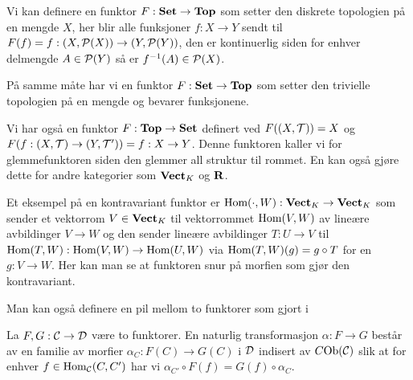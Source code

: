 \begin{eksempel}\label{Ex:DiskFunkt}
    Vi kan definere en funktor $F:\textnormal{\textbf{Set}}\to\textnormal{\textbf{Top}}$ som setter den diskrete topologien på en mengde $X$, her blir alle funksjoner $f: X\to Y$ sendt til $F(f)=f:(X,\mathcal{P}(X))\to (Y,\mathcal{P}(Y))$, den er kontinuerlig siden for enhver delmengde $A\in \mathcal{P}(Y)$ så er $f^{-1}(A)\in\mathcal{P}(X)$.
\end{eksempel}
På samme måte har vi en funktor $F:\textnormal{\textbf{Set}}\to\textnormal{\textbf{Top}}$ som setter den trivielle topologien på en mengde og bevarer funksjonene.

\begin{eksempel}\label{Ex:Glemmefunktor}
    Vi har også en funktor $F:\textnormal{\textbf{Top}}\to\textnormal{\textbf{Set}}$ definert ved $F((X,\mathcal{T})) = X$ og $F(f:(X,\mathcal{T})\to (Y,\mathcal{T}')) = f: X\to Y$. Denne funktoren kaller vi for glemmefunktoren siden den glemmer all struktur til rommet. En kan også gjøre dette for andre kategorier som $\textnormal{\textbf{Vect}}_K$ og $\textnormal{\textbf{{R}}}$.
\end{eksempel}

\begin{eksempel}\label{ex:Homfunkt}
  Et eksempel på en kontravariant funktor er
  $\textnormal{Hom}(\cdot,W):\textnormal{\textbf{Vect}}_K\to\textnormal{\textbf{Vect}}_K$ som sender et vektorrom
  $V\in\textnormal{\textbf{Vect}}_K$ til vektorrommet $\textnormal{Hom}(V,W)$ av lineære
  avbildinger $V\to W$ og den sender lineære avbildinger $T:U\to
  V$ til $\textnormal{Hom}(T,W):\textnormal{Hom}(V,W)\to\textnormal{Hom}(U,W)$ via
  $\textnormal{Hom}(T,W)(g)=g\circ T$ for en $g:V\to W$. Her kan man se at
  funktoren snur på morfien som gjør den kontravariant.
\end{eksempel}

Man kan også definere en pil mellom to funktorer som gjort
i \citep{Agore2023}
\begin{definisjon}\label{def:NatTrans}
  La $F,G:\mathcal{C}\to\mathcal{D}$ være to funktorer. En naturlig
  transformasjon $\alpha: F\to G$ består av en familie av
  morfier $\alpha_C: F(C)\to G(C)$ i $\mathcal{D}$ indisert av
  $C\textnormal{Ob}(\mathcal{C})$ slik at for enhver $f\in\textnormal{Hom}_{\mathcal{C}}(C,C')$
  har vi $\alpha_{C'}\circ F(f) = G(f)\circ\alpha_C$.
\end{definisjon}


